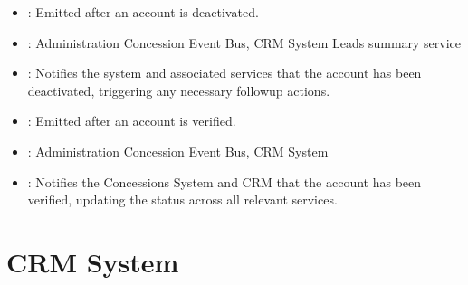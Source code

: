 \documentclass[letterpaper,10pt,english]{sphinxmanual}
\begin{document}
\sphinxAtStartPar
{}
\begin{itemize}
\item {} 
\sphinxAtStartPar
{}: Emitted after an account is deactivated.

\item {} 
\sphinxAtStartPar
{}: Administration Concession Event Bus, CRM System Leads summary service

\item {} 
\sphinxAtStartPar
{}: Notifies the system and associated services that the account has been deactivated, triggering any necessary follow\sphinxhyphen{}up actions.

\end{itemize}

\sphinxAtStartPar
{}
\begin{itemize}
\item {} 
\sphinxAtStartPar
{}: Emitted after an account is verified.

\item {} 
\sphinxAtStartPar
{}: Administration Concession Event Bus, CRM System

\item {} 
\sphinxAtStartPar
{}: Notifies the Concessions System and CRM that the account has been verified, updating the status across all relevant services.

\end{itemize}

\sphinxstepscope


\chapter{CRM System}
\label{\detokenize{crm_system/index:crm-system}}\label{\detokenize{crm_system/index::doc}}


\renewcommand{\indexname}{Index}
\printindex
\end{document}
